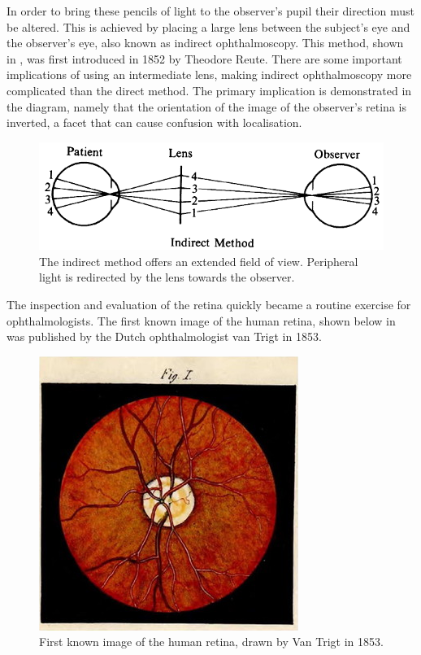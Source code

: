 In order to bring these pencils of light to the observer’s pupil their direction must be altered.  This is achieved by placing a large lens between the subject’s eye and the observer’s eye, also known as indirect ophthalmoscopy.  This method, shown in , was first introduced in 1852 by Theodore Reute.\cite{reutecgt}  There are some important implications of using an intermediate lens, making indirect ophthalmoscopy more complicated than the direct method.  The primary implication is demonstrated in the diagram, namely that the orientation of the image of the observer’s retina is inverted, a facet that can cause confusion with localisation.  

\begin{figure}[htbp]
\centering
  \includegraphics{figures/indirect_opthal2}
\caption{The indirect method offers an extended field of view.  Peripheral light is redirected by the lens towards the observer.}
\label{fig:indirect_main}
\end{figure}

The inspection and evaluation of the retina quickly became a routine exercise for ophthalmologists.  The first known image of the human retina, shown below in  was published by the Dutch ophthalmologist van Trigt in 1853.

\begin{figure}[htbp]
\centering
  \includegraphics{figures/first_human_retina}
\caption{First known image of the human retina, drawn by Van Trigt in 1853.\cite{van1853dissertatio}}
\label{fig:human_retina}
\end{figure}

